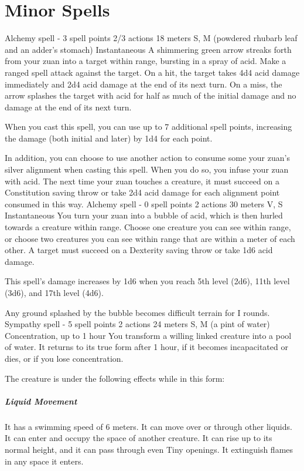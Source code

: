 \section{Minor Spells} \label{sec::minorspells}
    {Alchemy spell - 3 spell points}
    {2/3 actions}
    {18 meters}
    {S, M (powdered rhubarb leaf and an adder's stomach)}
    {Instantaneous}
    A shimmering green arrow streaks forth from your zuan into a target within range, bursting in a spray of acid.
    Make a ranged spell attack against the target.
    On a hit, the target takes 4d4 acid damage immediately and 2d4 acid damage at the end of its next turn.
    On a miss, the arrow splashes the target with acid for half as much of the initial damage and no damage at the end of its next turn.

    When you cast this spell, you can use up to 7 additional spell points, increasing the damage (both initial and later) by 1d4 for each point.

    In addition, you can choose to use another action to consume some your zuan's silver alignment when casting this spell.
    When you do so, you infuse your zuan with acid.
    The next time your zuan touches a creature, it must succeed on a Constitution saving throw or take 2d4 acid damage for each alignment point consumed in this way.
    {Alchemy spell - 0 spell points}
    {2 actions}
    {30 meters}
    {V, S}
    {Instantaneous}
    You turn your zuan into a bubble of acid, which is then hurled towards a creature within range.
    Choose one creature you can see within range, or choose two creatures you can see within range that are within a meter of each other.
    A target must succeed on a Dexterity saving throw or take 1d6 acid damage.

    This spell's damage increases by 1d6 when you reach 5th level (2d6), 11th level (3d6), and 17th level (4d6).

    Any ground splashed by the bubble becomes difficult terrain for I rounds.
    {Sympathy spell - 5 spell points}
    {2 actions}
    {24 meters}
    {S, M (a pint of water)}
    {Concentration, up to 1 hour}
    You transform a willing linked creature into a pool of water.
    It returns to its true form after 1 hour, if it becomes incapacitated or dies, or if you lose concentration.

    The creature is under the following effects while in this form:
    \subparagraph{Liquid Movement}
    It has a swimming speed of 6 meters.
    It can move over or through other liquids.
    It can enter and occupy the space of another creature.
    It can rise up to its normal height, and it can pass through even Tiny openings.
    It extinguish flames in any space it enters.

